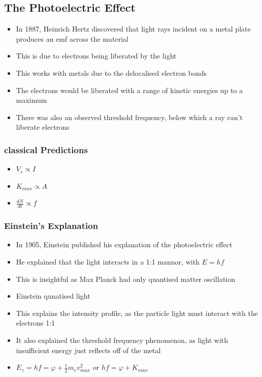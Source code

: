 \documentclass{article}
\begin{document}
\subsection{The Photoelectric Effect}

\begin{itemize}
    \item In 1887, Heinrich Hertz discovered that light rays incident on a metal plate produces an emf across the material
    \item This is due to electrons being liberated by the light
    \item This works with metals due to the delocalised electron bonds
    \item The electrons would be liberated with a range of kinetic energies up to a maximum
    \item There was also an observed threshold frequency, below which a ray can't liberate electrons
\end{itemize}

\subsubsection*{classical Predictions}
\begin{itemize}
    \item \(V_s\propto I\)
    \item \(K_{max}\propto A\)
    \item \(\frac{dN}{dt}\propto f\)
\end{itemize}

\subsubsection*{Einstein's Explanation}
\begin{itemize}
    \item In 1905, Einstein published his explanation of the photoelectric effect
    \item He explained that the light interacts in a 1:1 mannor, with \(E=hf\)
    \item This is insightful as Max Planck had only quantised matter oscillation
    \item Einstein qunatised light
    \item This explains the intensity profile, as the particle light must interact with the electrons 1:1
    \item It also explained the threshold frequency phenomenon, as light with insufficient energy just reflects off of the metal
    \item \(E_\gamma = hf=\varphi+\frac{1}{2}m_e v_{max}^2\) or \(hf = \varphi + K_{max}\)
\end{itemize}
\end{document}
